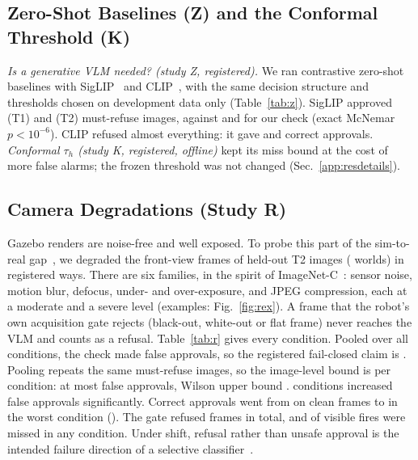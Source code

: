 \documentclass[conference]{IEEEtran}
\begin{document}
\subsection{Zero-Shot Baselines (Z) and the Conformal Threshold (K)}\label{sec:moved-z}
\emph{Is a generative VLM needed? (study Z, registered).} We ran contrastive zero-shot baselines with SigLIP~\cite{zhai2023siglip}
and CLIP~\cite{radford2021clip}, with the same decision structure and thresholds chosen on development data only
(Table~\ref{tab:z}). SigLIP approved
\ZSigTOneFA{} (T1) and \ZSigTTwoFA{} (T2) must-refuse images, against \ZOursTOneFA{} and \ZOursTTwoFA{} for our check
(exact McNemar $p<10^{-6}$). CLIP refused almost everything: it gave \ZClipTOneCA{} and \ZClipTTwoCA{} correct approvals.
\emph{Conformal $\tau_h$ (study K, registered, offline)} kept its miss bound at the cost of more false alarms; the frozen threshold was not changed (Sec.~\ref{app:resdetails}).

\subsection{Camera Degradations (Study R)}\label{sec:moved-r}
Gazebo renders are noise-free and well exposed. To probe this part of the sim-to-real gap~\cite{hofer2021sim2real}, we degraded the front-view frames of \RNimg{} held-out T2 images
(\RNworlds{} worlds) in \RNcond{} registered ways. There are six families, in the spirit of ImageNet-C~\cite{hendrycks2019benchmarking}: sensor noise, motion blur, defocus, under- and
over-exposure, and JPEG compression, each at a moderate and a severe level (examples: Fig.~\ref{fig:rex}). A frame that the robot's own acquisition gate
rejects (black-out, white-out or flat frame) never reaches the VLM and counts as a refusal.
Table~\ref{tab:r} gives every condition. Pooled over all conditions, the check made \RPoolFA{} false approvals, so the registered fail-closed claim is \RPoolSupported. Pooling repeats the same \RNdeny{} must-refuse images, so the image-level bound is per condition: at most \RCondFAMax{} false approvals, Wilson upper bound \RCondFAUpper. \RUnsafeConds{} conditions increased false
approvals significantly. Correct approvals went from \RCleanCA{} on clean frames to \RWorstCA{} in the
worst condition (\RWorstCond). The gate refused \RGateRej{} frames in total, and \RFireMissMax{} of \RNfire{} visible fires were missed in any
condition. Under shift, refusal rather than unsafe approval is the intended failure direction of a selective classifier~\cite{geifman2017selective}.
\end{document}
